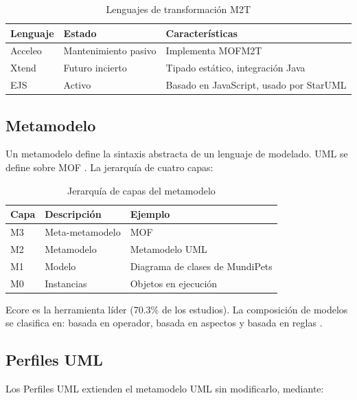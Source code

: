 \documentclass[journal,onecolumn]{IEEEtran}
\begin{document}
\begin{table}[H]
	\centering
	\caption{Lenguajes de transformación M2T}
	\label{tab:m2t-lenguajes}
	\begin{tabular}{|l|l|p{6cm}|}
		\hline
		\textbf{Lenguaje} & \textbf{Estado} & \textbf{Características} \\
		\hline
		Acceleo & Mantenimiento pasivo & Implementa MOFM2T \\
		\hline
		Xtend & Futuro incierto & Tipado estático, integración Java \\
		\hline
		EJS & Activo & Basado en JavaScript, usado por StarUML \\
		\hline
	\end{tabular}
\end{table}

\subsection{Metamodelo}

Un metamodelo define la sintaxis abstracta de un lenguaje de modelado. UML se define sobre MOF \cite{Zafar2024}. La jerarquía de cuatro capas:

\begin{table}[H]
	\centering
	\caption{Jerarquía de capas del metamodelo}
	\label{tab:metamodelo-capas}
	\begin{tabular}{|l|l|l|}
		\hline
		\textbf{Capa} & \textbf{Descripción} & \textbf{Ejemplo} \\
		\hline
		M3 & Meta-metamodelo & MOF \\
		\hline
		M2 & Metamodelo & Metamodelo UML \\
		\hline
		M1 & Modelo & Diagrama de clases de MundiPets \\
		\hline
		M0 & Instancias & Objetos en ejecución \\
		\hline
	\end{tabular}
\end{table}

Ecore es la herramienta líder (70.3\% de los estudios). La composición de modelos se clasifica en: basada en operador, basada en aspectos y basada en reglas \cite{Abouzahra2020}.

\subsection{Perfiles UML}

Los Perfiles UML extienden el metamodelo UML sin modificarlo, mediante:
\end{document}
